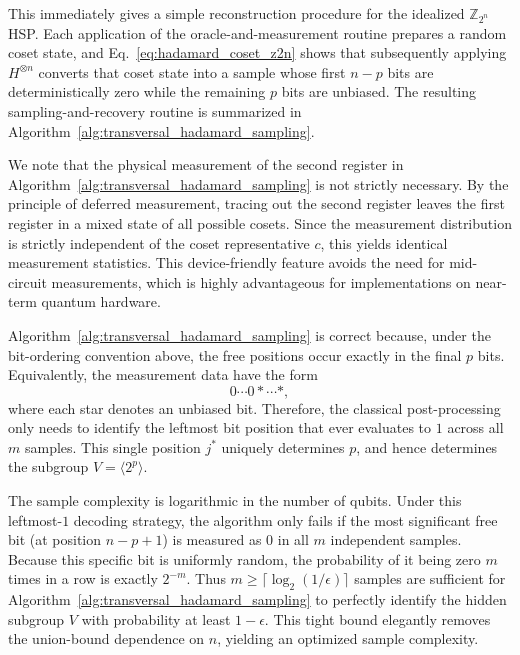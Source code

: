 This immediately gives a simple reconstruction procedure for the idealized $\mathbb{Z}_{2^n}$ HSP.
Each application of the oracle-and-measurement routine prepares a random coset state, and Eq.~\eqref{eq:hadamard_coset_z2n} shows that subsequently applying $H^{\otimes n}$ converts that coset state into a sample whose first $n-p$ bits are deterministically zero while the remaining $p$ bits are unbiased.
The resulting sampling-and-recovery routine is summarized in Algorithm~\ref{alg:transversal_hadamard_sampling}.

We note that the physical measurement of the second register in Algorithm~\ref{alg:transversal_hadamard_sampling} is not strictly necessary. By the principle of deferred measurement, tracing out the second register leaves the first register in a mixed state of all possible cosets. Since the measurement distribution is strictly independent of the coset representative $c$, this yields identical measurement statistics. This device-friendly feature avoids the need for mid-circuit measurements, which is highly advantageous for implementations on near-term quantum hardware.



Algorithm~\ref{alg:transversal_hadamard_sampling} is correct because, under the bit-ordering convention above, the free positions occur exactly in the final $p$ bits.
Equivalently, the measurement data have the form
\begin{equation}
    0\cdots 0 * \cdots *,
\end{equation}
where each star denotes an unbiased bit.
Therefore, the classical post-processing only needs to identify the leftmost bit position that ever evaluates to $1$ across all $m$ samples. This single position $j^*$ uniquely determines $p$, and hence determines the subgroup $V=\langle 2^p\rangle$.

The sample complexity is logarithmic in the number of qubits.
Under this leftmost-$1$ decoding strategy, the algorithm only fails if the most significant free bit (at position $n-p+1$) is measured as $0$ in all $m$ independent samples.
Because this specific bit is uniformly random, the probability of it being zero $m$ times in a row is exactly $2^{-m}$.
Thus $m\ge \lceil \log_2(1/\epsilon)\rceil$ samples are sufficient for Algorithm~\ref{alg:transversal_hadamard_sampling} to perfectly identify the hidden subgroup $V$ with probability at least $1-\epsilon$. This tight bound elegantly removes the union-bound dependence on $n$, yielding an optimized sample complexity.


